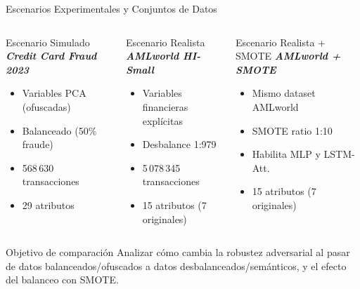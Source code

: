 \documentclass[aspectratio=169, 8pt]{beamer}
\begin{document}
\begin{frame}{Escenarios Experimentales y Conjuntos de Datos}

\begin{columns}[t]

\begin{block}{Escenario Simulado}
\textbf{\textit{Credit Card Fraud 2023}}
\vspace{0.1cm}
\begin{itemize}\small
\item Variables PCA (ofuscadas)
\item Balanceado (50\% fraude)
\item 568\,630 transacciones
\item 29 atributos
\end{itemize}
\end{block}

\begin{block}{Escenario Realista}
\textbf{\textit{AMLworld HI-Small}}
\vspace{0.1cm}
\begin{itemize}\small
\item Variables financieras explícitas
\item Desbalance 1:979
\item 5\,078\,345 transacciones
\item 15 atributos (7 originales)
\end{itemize}
\end{block}

\begin{block}{Escenario Realista + SMOTE}
\textbf{\textit{AMLworld + SMOTE}}
\vspace{0.1cm}
\begin{itemize}\small
\item Mismo dataset AMLworld
\item SMOTE ratio 1:10
\item Habilita MLP y LSTM-Att.
\item 15 atributos (7 originales)
\end{itemize}
\end{block}

\end{columns}

\vspace{0.3cm}

\begin{alertblock}{Objetivo de comparación}
Analizar cómo cambia la robustez adversarial al pasar de datos balanceados/ofuscados
a datos desbalanceados/semánticos, y el efecto del balanceo con SMOTE.
\end{alertblock}

\end{frame}
\end{document}
